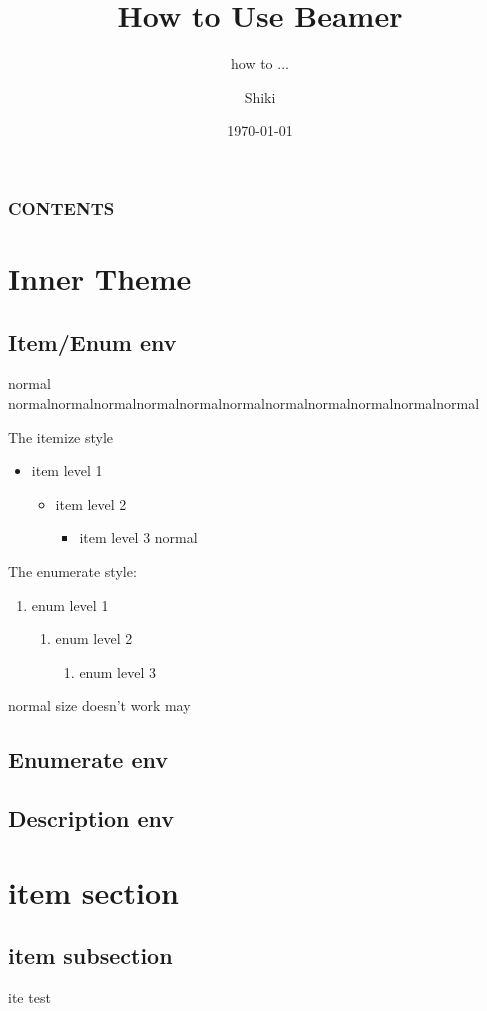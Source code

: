 \documentclass[20pt]{beamer}
\title{How to Use Beamer}
\subtitle{how to ...}
\author{Shiki \inst{1}}
\institute{\inst{1} xxxx}
\date{\today}
\begin{document}
  \yaihe
  \begin{frame}[plain]
    \titlepage
    \addtocounter{framenumber}{-1}
  \end{frame}
  \begin{frame}[plain]
    \frametitle{CONTENTS}
    \tableofcontents[hideallsubsections]
    \addtocounter{framenumber}{-1}
  \end{frame}

  \section{Inner Theme}
  \subsection{Item/Enum env}
  \begin{frame}[allowframebreaks, t]
    normal normalnormalnormalnormalnormalnormalnormalnormalnormalnormalnormal
    \par
    The itemize style
    \begin{itemize}
    	\item item level 1
        \begin{itemize}
        	\item item level 2
            \begin{itemize}
            	\item item level 3
                normal
            \end{itemize}
        \end{itemize}
    \end{itemize}

    The enumerate style:
    \begin{enumerate}
    	\item enum level 1
        \begin{enumerate}
        	\item enum level 2
            \begin{enumerate}
            	\item enum level 3
            \end{enumerate}
        \end{enumerate}
    \end{enumerate}
    normal size doesn't work may
  \end{frame}
  \subsection{Enumerate env}
  \subsection{Description env}
  \section{item section}
  \subsection{item subsection}
  \begin{frame}[t]{ite}
    test
  \end{frame}
\end{document}
